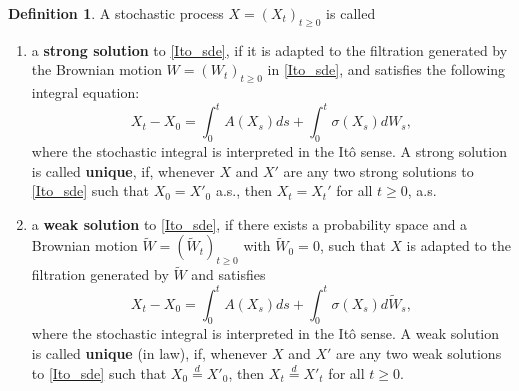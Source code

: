 \documentclass[10pt,a4paper]{amsart}
\theoremstyle{definition}
\newtheorem{definition}[theorem]{Definition}
\theoremstyle{remark}
\theoremstyle{consequence}
\numberwithin{equation}{section}
\begin{document}
\begin{definition}
  A stochastic process $X = (X_t)_{t \geq 0}$ is called 

  \begin{enumerate}
    \item a \textbf{strong solution} to \eqref{Ito_sde}, if it is adapted to the filtration generated by the Brownian motion $W = (W_t)_{t \geq 0}$ in \eqref{Ito_sde}, and satisfies the following integral equation:
  \[
    X_t - X_0 = \int_0^t A(X_s) ds + \int_0^t \sigma (X_s) d W_s,
  \]
  where the stochastic integral is interpreted in the It\^o sense. A strong solution is called \textbf{unique}, if, whenever $X$ and $X'$ are any two strong solutions to \eqref{Ito_sde} such that $X_0 = X'_0$ a.s., then $X_t = X_t'$ for all $t \geq 0$, a.s. 

  \item a \textbf{weak solution} to \eqref{Ito_sde}, if there exists a probability space and a Brownian motion $\widetilde{W} = (\widetilde{W}_t)_{t \geq 0}$ with $\widetilde{W}_0 = 0$, such that $X$ is adapted to the filtration generated by $\widetilde{W}$ and 
  satisfies 
  \[
    X_t - X_0 = \int_0^t A(X_s) ds + \int_0^t \sigma (X_s) d \widetilde{W}_s,
  \]
  where the stochastic integral is interpreted in the It\^o sense. A weak solution is called \textbf{unique} (in law), if, whenever $X$ and $X'$ are any two weak solutions to \eqref{Ito_sde} such that $X_0 \overset{d}{=} X'_0$, then $X_t \overset{d}{=} X'_t$ for all $t \geq 0$. 
  \end{enumerate}


\end{definition}
\end{document}
